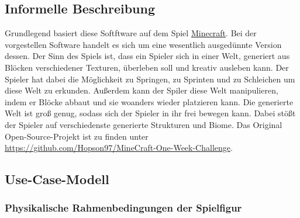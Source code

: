 \documentclass{article}
\begin{document}
\subsection{Informelle Beschreibung} \label{subsec:inf}

Grundlegend basiert diese Softftware auf dem Spiel \href{https://www.minecraft.net}{Minecraft}. Bei der vorgestellen Software handelt es sich um eine wesentlich ausgedünnte Version dessen. Der Sinn des Spiels ist, dass ein Spieler sich in einer Welt, generiert aus Blöcken verschiedener Texturen, überleben soll und kreativ ausleben kann. Der Spieler hat dabei die Möglichkeit zu Springen, zu Sprinten und zu Schleichen um diese Welt zu erkunden. Außerdem kann der Spiler diese Welt manipulieren, indem er Blöcke abbaut und sie woanders wieder platzieren kann. Die generierte Welt ist groß genug, sodass sich der Spieler in ihr frei bewegen kann. Dabei stößt der Spieler auf verschiedenste generierte Strukturen und Biome. Das Original Open-Source-Projekt ist zu finden unter \url{https://github.com/Hopson97/MineCraft-One-Week-Challenge}.

\subsection{Use-Case-Modell} \label{subsec:usecase}

\begin{center}
\end{center}

\subsubsection*{Physikalische Rahmenbedingungen der Spielfigur}
\end{document}
